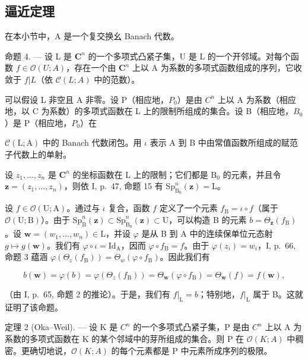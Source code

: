 \subsection{逼近定理}

在本小节中，A 是一个复交换幺 Banach 代数。

命题 4. --- 设 L 是 \(\mathbf{C}^{n}\) 的一个多项式凸紧子集，U 是 L 的一个开邻域。对每个函数 \(f\in\mathcal{O}(U;A)\)，存在一个由 \(\mathbf{C}^{n}\) 上以 A 为系数的多项式函数组成的序列，它收敛于 \(f|L\)（依 \(\mathcal{C}(L;A)\) 中的范数）。

可以假设 L 非空且 A 非零。设 P（相应地，\(P_{0}\)）是由 \(C^{n}\) 上以 A 为系数（相应地，以 C 为系数）的多项式函数在 L 上的限制所组成的集合。设 B（相应地，\(B_{0}\)）是 P（相应地，\(P_{0}\)）在

\(\mathcal{C}(\mathrm{L};\mathrm{A})\) 中的 Banach 代数闭包。用 \(\iota\) 表示 A 到 B 中由常值函数所组成的赋范子代数上的单射。

设 \(z_{1},\ldots,z_{n}\) 是 \(\mathbf{C}^{n}\) 的坐标函数在 L 上的限制；它们都是 \(\mathrm{B}_{0}\) 的元素，并且令 \(\boldsymbol{z}=(z_{1},\ldots,z_{n})\)，则依 I, p.~47, 命题 15 有 \(\mathrm{Sp}_{\mathrm{B}_{0}}^{n}(\boldsymbol{z})=\mathrm{L}\)。

设 \(f \in \mathcal{O}(\mathrm{U};\mathrm{A})\)。通过与 \(\iota\) 复合，函数 \(f\) 定义了一个元素 \(f_{\mathrm{B}} = \iota \circ f\)（属于 \(\mathcal{O}(\mathrm{U};\mathrm{B})\)）。由于 \(\mathrm{Sp}_{\mathrm{B}}^{n}(\boldsymbol{z}) \subset \mathrm{Sp}_{\mathrm{B}_{0}}^{n}(\boldsymbol{z}) \subset \mathrm{U}\)，可以构造 B 的元素 \(b = \Theta_{\boldsymbol{z}}(f_{\mathrm{B}})\)。设 \(\boldsymbol{w} = (w_{1},\ldots ,w_{n}) \in \mathrm{L}\)，并设 \(\varphi\) 是从 B 到 A 中的连续保单位元态射 \(g \mapsto g(\boldsymbol{w})\)。我们有 \(\varphi \circ \iota = \mathrm{Id}_{\mathrm{A}}\)，因而 \(\varphi \circ f_{\mathrm{B}} = f\)。由于 \(\varphi (z_i) = w_i\)，I, p.~66, 命题 3 蕴涵 \(\varphi (\Theta_z(f_{\mathrm{B}})) = \Theta_w(\varphi \circ f_{\mathrm{B}})\)。因此我们有

\[
b (\pmb {w}) = \varphi (b) = \varphi (\Theta_ {z} (f _ {\mathrm{B}})) = \Theta_ {\pmb {w}} (\varphi \circ f _ {\mathrm{B}}) = \Theta_ {\pmb {w}} (f) = f (\pmb {w}),
\]

（由 I, p.~65, 命题 2 的推论）。于是，我们有 \(f|_{\mathrm{L}} = b\)；特别地，\(f|_{\mathrm{L}}\) 属于 B。这就证明了该命题。

定理 2 (Oka--Weil). --- 设 K 是 \(C^{n}\) 的一个多项式凸紧子集，P 是由 \(C^{n}\) 上以 A 为系数的多项式函数在 K 的某个邻域中的芽所组成的集合。则 P 在 \(\mathcal{O}(K;A)\) 中稠密。更确切地说，\(\mathcal{O}(K;A)\) 的每个元素都是 P 中元素所成序列的极限。

